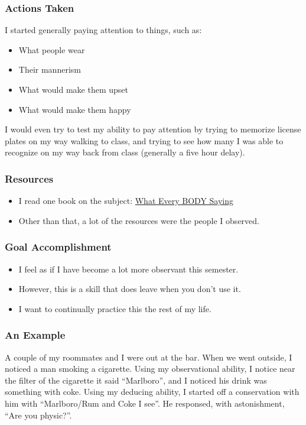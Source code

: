 \documentclass[xclolor=dvipsnames]{beamer}            %
\begin{document}
\begin{darkframes}
    \begin{frame}
        \frametitle{Actions Taken}
        I started generally paying attention to things, such as:

        \begin{itemize}
            \item What people wear
            \item Their mannerism
            \item What would make them upset
            \item What would make them happy
        \end{itemize}

        I would even try to test my ability to pay attention by trying to memorize license plates on my way walking to class, and trying to see how many I was able to recognize on my way back from class (generally a five hour delay).
    \end{frame}


    \begin{frame}
        \frametitle{Resources}

        \begin{itemize}
            \item I read one book on the subject: \href{https://www.amazon.com/What-Every-BODY-Saying-Speed-Reading/dp/B006ZNFEKW}{What Every BODY Saying}
            \item Other than that, a lot of the resources were the people I observed.
        \end{itemize}
    \end{frame}

    \begin{frame}
        \frametitle{Goal Accomplishment}

        \begin{itemize}
            \item I feel as if I have become a lot more observant this semester.
            \item However, this is a skill that does leave when you don't use it.
            \item I want to continually practice this the rest of my life.
        \end{itemize}
    \end{frame}

    \begin{frame}
        \frametitle{An Example}

        A couple of my roommates and I were out at the bar. When we went outside, I noticed a man smoking a cigarette. Using my observational ability, I notice near the filter of the cigarette it said ``Marlboro'', and I noticed his drink was something with coke. Using my deducing ability, I started off a conservation with him with ``Marlboro/Rum and Coke I see''. He responsed, with astonishment, ``Are you physic?''.


\end{frame}
\end{darkframes}
\end{document}
